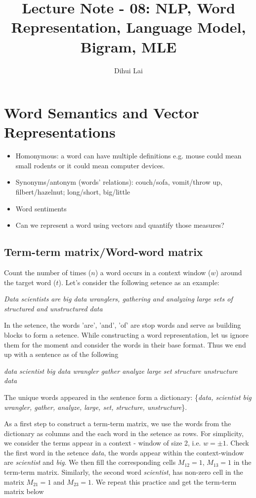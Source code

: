 \documentclass[12pt, oneside]{article}
\title{Lecture Note - 08: NLP, Word Representation, Language Model, Bigram, MLE}
\author{Dihui Lai}
\begin{document}
\maketitle
\tableofcontents

\vspace{.25in}


\section{Word Semantics and Vector Representations}
\begin{itemize} 
\item Homonymous: a word can have multiple definitions e.g. mouse could mean small rodents or it could mean computer devices. 
\item Synonyms/antonym (words' relations): couch/sofa, vomit/throw up, filbert/hazelnut; long/short, big/little
\item Word sentiments
\item Can we represent a word using vectors and quantify those measures?
\end{itemize}

\subsection{Term-term matrix/Word-word matrix}
Count the number of times ($n$) a word occurs in a context window ($w$) around the target word ($t$). Let's consider the following setence as an example:

\textit{Data scientists are big data wranglers, gathering and analyzing large sets of structured and unstructured data}

In the setence, the words 'are', 'and', 'of' are stop words and serve as building blocks to form a setence. While constructing a word representation, let us ignore them for the moment and consider the words in their base format. Thus we end up with a sentence as of the following 

\textit{data scientist big data wrangler gather analyze large set structure unstructure data}

The unique words appeared in the sentence form a dictionary: \{\textit{data, scientist big wrangler, gather, analyze, large, set, structure, unstructure}\}. 

As a first step to construct a term-term matrix, we use the words from the dictionary as columns and the each word in the setence as rows. For simplicity, we consider the terms appear in a context - window of size 2, i.e. $w=\pm 1$. Check the first word in the setence \textit{data}, the words appear within the context-window are \textit{scientist} and \textit{big}. We then fill the corresponding cells $M_{12} = 1$, $M_{13} = 1$ in the term-term matrix. Similarly, the second word \textit{scientist}, has non-zero cell in the matrix $M_{21}=1$ and $M_{23}=1$. We repeat this practice and get the term-term matrix below
\end{document}

